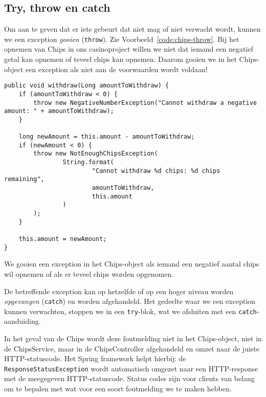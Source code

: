 \subsection{Try, throw en catch}
Om aan te geven dat er iets gebeurt dat niet mag of niet verwacht wordt, kunnen we een
exception \textit{gooien} (\texttt{throw}). Zie Voorbeeld~\ref{code:chips-throw}.
Bij het opnemen van Chips in ons casinoproject willen we niet dat iemand 
een negatief getal kan opnemen of teveel chips kan opnemen. Daarom gooien we in 
het Chips-object een exception als niet aan de voorwaarden wordt voldaan! 

\begin{listing}[H]
\begin{verbatim}
public void withdraw(Long amountToWithdraw) {
    if (amountToWithdraw < 0) {
        throw new NegativeNumberException("Cannot withdraw a negative amount: " + amountToWithdraw);
    }

    long newAmount = this.amount - amountToWithdraw;
    if (newAmount < 0) {
        throw new NotEnoughChipsException(
                String.format(
                        "Cannot withdraw %d chips: %d chips remaining",
                        amountToWithdraw,
                        this.amount
                )
        );
    }

    this.amount = newAmount;
}
\end{verbatim}
\caption{We gooien een exception in het Chips-object als iemand een negatief aantal chips 
wil opnemen of als er teveel chips worden opgenomen.}
\label{code:chips-throw}
\end{listing}

De betreffende exception kan op hetzelfde 
of op een hoger niveau worden \textit{opgevangen} (\texttt{catch}) en worden afgehandeld.
Het gedeelte waar we een exception kunnen verwachten, stoppen we in een \texttt{try}-blok,
wat we afsluiten met een \texttt{catch}-aanduiding.

In het geval van de Chips wordt deze foutmelding niet in het Chips-object,
niet in de ChipsService, maar in de ChipsController afgehandeld en omzet naar 
de juiste HTTP-statuscode. Het Spring framework helpt hierbij: 
de \texttt{ResponseStatusException} wordt automatisch omgezet naar een HTTP-response met 
de meegegeven HTTP-statuscode. Status codes zijn voor clients van belang om te bepalen 
met wat voor een soort foutmelding we te maken hebben.

